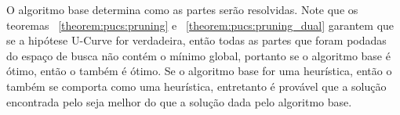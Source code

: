 O algoritmo base determina como as partes serão resolvidas. Note que os 
teoremas ~\ref{theorem:pucs:pruning} e ~\ref{theorem:pucs:pruning_dual}
garantem que se a hipótese U-Curve for verdadeira, então todas as partes
que foram podadas do espaço de busca não contém o mínimo global, 
portanto se o algoritmo base é ótimo, então o  também é
ótimo. Se o algoritmo base for uma heurística, então o 
também se comporta como uma heurística, entretanto é provável que a 
solução encontrada pelo  seja melhor do que a solução 
dada pelo algoritmo base.
